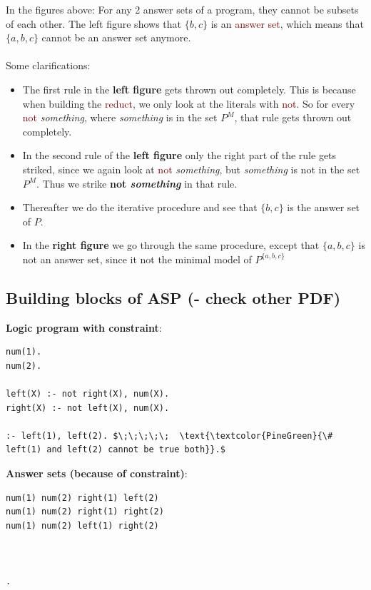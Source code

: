 In the figures above:
For any 2 answer sets of a program, they cannot be subsets of each other. The left figure shows that $\{b,c\}$ is an \textcolor{Maroon}{answer set}, which means that $\{a,b,c\}$ cannot be an answer set anymore. \\
\\
Some clarifications:
\begin{itemize}
    \item The first rule in the \textbf{left figure} gets thrown out completely. This is because when building the \textcolor{Maroon}{reduct}, we only look at the literals with \textcolor{Maroon}{not}. So for every \textcolor{Maroon}{not} \textit{something}, where \textit{something} is in the set $P^M$, that rule gets thrown out completely.
    \item In the second rule of the \textbf{left figure} only the right part of the rule gets striked, since we again look at \textcolor{Maroon}{not} \textit{something}, but \textit{something} is not in the set $P^M$. Thus we strike \textbf{not \textit{something}} in that rule.
    \item Thereafter we do the iterative procedure and see that $\{b,c\}$ is the answer set of $P$.
    \item In the \textbf{right figure} we go through the same procedure, except that $\{a,b,c\}$ is not an answer set, since it not the minimal model of $P^{\{a,b,c\}}$
\end{itemize}

\subsection{Building blocks of ASP (- check other PDF)}
\begin{minipage}{0.5\textwidth}
\textbf{Logic program with constraint}:
\begin{lstlisting}
num(1).
num(2).

left(X) :- not right(X), num(X).
right(X) :- not left(X), num(X).

:- left(1), left(2). $\;\;\;\;\;  \text{\textcolor{PineGreen}{\# left(1) and left(2) cannot be true both}}.$
\end{lstlisting}
\end{minipage}
\begin{minipage}{0.5\textwidth}
\textbf{Answer sets (because of constraint)}:
\begin{lstlisting}
num(1) num(2) right(1) left(2)
num(1) num(2) right(1) right(2)
num(1) num(2) left(1) right(2)



.
\end{lstlisting}
\end{minipage}

